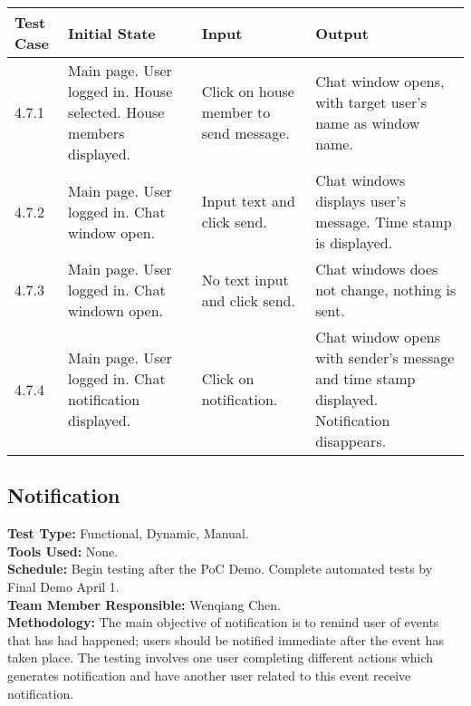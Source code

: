 \documentclass[12pt]{article}
\begin{document}
\begin{longtable}[l]{|p{2cm}|p{3cm}|p{5cm}|p{5cm}|}
\hline
\textbf{Test Case}  & \textbf{Initial State} & \textbf{Input} & \textbf{Output} \\ \hline
4.7.1 & Main page. User logged in. House selected. House members displayed. & Click on house member to send message. & Chat window opens, with target user's name as window name. \\ 
\hline
4.7.2 & Main page. User logged in. Chat window open. & Input text and click send. & Chat windows displays user's message. Time stamp is displayed. \\ 
\hline
4.7.3 & Main page. User logged in. Chat windown open. & No text input and click send. & Chat windows does not change, nothing is sent. \\ 
\hline
4.7.4 & Main page. User logged in. Chat notification displayed. & Click on notification. & Chat window opens with sender's message and time stamp displayed. Notification disappears. \\
\hline
\end{longtable}

\subsection{Notification}
\textbf{Test Type:} Functional, Dynamic, Manual. \\
\textbf{Tools Used:} None. \\
\textbf{Schedule:} Begin testing after the PoC Demo. Complete automated tests by Final Demo April 1. \\
\textbf{Team Member Responsible:} Wenqiang Chen. \\
\textbf{Methodology:} The main objective of notification is to remind user of events that has had happened; users should be notified immediate after the event has taken place. The testing involves one user completing different actions which generates notification and have another user related to this event receive notification.
\end{document}
